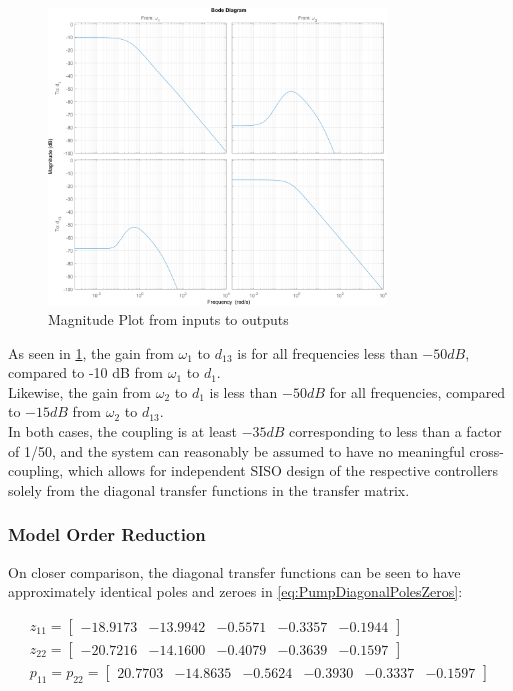 \begin{figure}[h!]
	\centering
		\includegraphics[width=0.8\textwidth]{Pictures/PumpMagPlot.png}
		
		\caption{Magnitude Plot from inputs to outputs}
	\label{fig:PumpMagPlot}
\end{figure}

As seen in \cref{fig:PumpMagPlot}, the gain from $\omega_1$ to $d_{13}$ is for all frequencies less than $ -50 \si{dB} $, compared to -10 dB from $\omega_1$ to $d_1$. \\
Likewise, the gain from $\omega_2$ to $d_1$ is less than $ -50 \si{dB} $ for all frequencies, compared to $ -15 \si{dB} $ from $\omega_2$ to $d_{13}$.\\
In both cases, the coupling is at least $ -35 \si{dB} $ corresponding to less than a factor of 1/50, and the system can reasonably be assumed to have no meaningful cross-coupling, which allows for independent SISO design of the respective controllers solely from the diagonal transfer functions in the transfer matrix.

\subsubsection{Model Order Reduction}
On closer comparison, the diagonal transfer functions can be seen to have approximately identical poles and zeroes in  \cref{eq:PumpDiagonalPolesZeros}: 

\begin{equation}\label{eq:PumpDiagonalPolesZeros}
	\begin{gathered}
		z_{11} = \begin{bmatrix}-18.9173&  -13.9942&   -0.5571&   -0.3357&   -0.1944 \end{bmatrix} \\
		z_{22} = \begin{bmatrix}-20.7216&  -14.1600&   -0.4079&   -0.3639&   -0.1597 \end{bmatrix} \\
		p_{11} = p_{22} = \begin{bmatrix} 20.7703&  -14.8635&   -0.5624&   -0.3930&   -0.3337&   -0.1597 \end{bmatrix} \\
	\end{gathered}
\end{equation}

